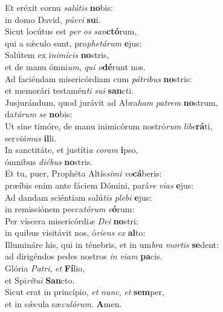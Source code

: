 \evenverse Et eréxit cornu \textit{sa}\textit{lú}\textit{tis} \textbf{no}bis:~\*\\
\evenverse in domo David, \textit{pú}\textit{e}\textit{ri} \textbf{su}i.\\
\oddverse Sicut locútus est \textit{per} \textit{os} \textit{san}\textbf{ctó}rum,~\*\\
\oddverse qui a sǽculo sunt, pro\textit{phe}\textit{tá}\textit{rum} \textbf{e}jus:\\
\evenverse Salútem ex i\textit{ni}\textit{mí}\textit{cis} \textbf{no}stris,~\*\\
\evenverse et de manu ómni\textit{um}, \textit{qui} \textit{o}\textbf{dé}runt nos.\\
\oddverse Ad faciéndam misericórdiam cum \textit{pá}\textit{tri}\textit{bus} \textbf{no}stris:~\*\\
\oddverse et memorári testamén\textit{ti} \textit{su}\textit{i} \textbf{san}cti.\\
\evenverse Jusjurándum, quod jurávit ad Abra\textit{ham} \textit{pa}\textit{trem} \textbf{no}strum,~\*\\
\evenverse da\textit{tú}\textit{rum} \textit{se} \textbf{no}bis:\\
\oddverse Ut sine timóre, de manu inimicórum nostró\textit{rum} \textit{li}\textit{be}\textbf{rá}ti,~\*\\
\oddverse ser\textit{vi}\textit{á}\textit{mus} \textbf{il}li.\\
\evenverse In sanctitáte, et justíti\textit{a} \textit{co}\textit{ram} \textbf{i}pso,~\*\\
\evenverse ómnibus \textit{di}\textit{é}\textit{bus} \textbf{no}stris.\\
\oddverse Et tu, puer, Prophéta Altís\textit{si}\textit{mi} \textit{vo}\textbf{cá}beris:~\*\\
\oddverse præíbis enim ante fáciem Dómini, pará\textit{re} \textit{vi}\textit{as} \textbf{e}jus:\\
\evenverse Ad dandam sciéntiam salú\textit{tis} \textit{ple}\textit{bi} \textbf{e}jus:~\*\\
\evenverse in remissiónem pecca\textit{tó}\textit{rum} \textit{e}\textbf{ó}rum:\\
\oddverse Per víscera misericórdi\textit{æ} \textit{De}\textit{i} \textbf{no}stri:~\*\\
\oddverse in quibus visitávit nos, ó\textit{ri}\textit{ens} \textit{ex} \textbf{al}to:\\
\evenverse Illumináre his, qui in ténebris, et in um\textit{bra} \textit{mor}\textit{tis} \textbf{se}dent:~\*\\
\evenverse ad dirigéndos pedes nostros \textit{in} \textit{vi}\textit{am} \textbf{pa}cis.\\
\oddverse Glória \textit{Pa}\textit{tri}, \textit{et} \textbf{Fí}lio,~\*\\
\oddverse et Spi\textit{rí}\textit{tu}\textit{i} \textbf{San}cto.\\
\evenverse Sicut erat in princípio, \textit{et} \textit{nunc}, \textit{et} \textbf{sem}per,~\*\\
\evenverse et in sǽcula sæ\textit{cu}\textit{ló}\textit{rum}. \textbf{A}men.\\
